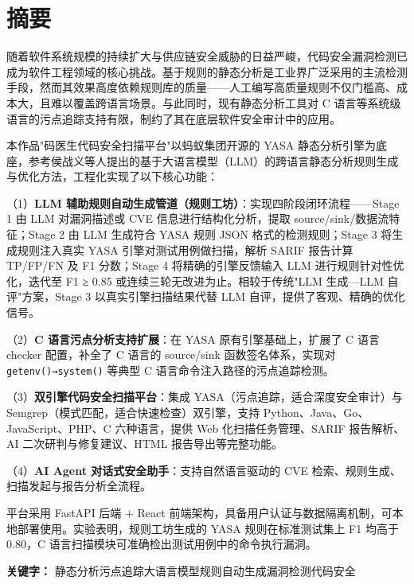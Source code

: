 \documentclass[a4paper,12pt,UTF8]{ctexart}
\numberwithin{figure}{section}
\numberwithin{table}{section}
\numberwithin{equation}{section}
\begin{document}
\thispagestyle{empty}
\tableofcontents
\newpage

\setcounter{page}{1}

\section*{摘要} 
\vspace{0.3cm}

{\songti
随着软件系统规模的持续扩大与供应链安全威胁的日益严峻，代码安全漏洞检测已成为软件工程领域的核心挑战。基于规则的静态分析是工业界广泛采用的主流检测手段，然而其效果高度依赖规则库的质量——人工编写高质量规则不仅门槛高、成本大，且难以覆盖跨语言场景。与此同时，现有静态分析工具对 C 语言等系统级语言的污点追踪支持有限，制约了其在底层软件安全审计中的应用。

本作品"码医生代码安全扫描平台"以蚂蚁集团开源的 YASA 静态分析引擎为底座，参考侯战义等人提出的基于大语言模型（LLM）的跨语言静态分析规则生成与优化方法，工程化实现了以下核心功能：

（1）\textbf{LLM 辅助规则自动生成管道（规则工坊）}：实现四阶段闭环流程——Stage 1 由 LLM 对漏洞描述或 CVE 信息进行结构化分析，提取 source/sink/数据流特征；Stage 2 由 LLM 生成符合 YASA 规则 JSON 格式的检测规则；Stage 3 将生成规则注入真实 YASA 引擎对测试用例做扫描，解析 SARIF 报告计算 TP/FP/FN 及 F1 分数；Stage 4 将精确的引擎反馈输入 LLM 进行规则针对性优化，迭代至 F1 ≥ 0.85 或连续三轮无改进为止。相较于传统"LLM 生成—LLM 自评"方案，Stage 3 以真实引擎扫描结果代替 LLM 自评，提供了客观、精确的优化信号。

（2）\textbf{C 语言污点分析支持扩展}：在 YASA 原有引擎基础上，扩展了 C 语言 checker 配置，补全了 C 语言的 source/sink 函数签名体系，实现对 \texttt{getenv()→system()} 等典型 C 语言命令注入路径的污点追踪检测。

（3）\textbf{双引擎代码安全扫描平台}：集成 YASA（污点追踪，适合深度安全审计）与 Semgrep（模式匹配，适合快速检查）双引擎，支持 Python、Java、Go、JavaScript、PHP、C 六种语言，提供 Web 化扫描任务管理、SARIF 报告解析、AI 二次研判与修复建议、HTML 报告导出等完整功能。

（4）\textbf{AI Agent 对话式安全助手}：支持自然语言驱动的 CVE 检索、规则生成、扫描发起与报告分析全流程。

平台采用 FastAPI 后端 + React 前端架构，具备用户认证与数据隔离机制，可本地部署使用。实验表明，规则工坊生成的 YASA 规则在标准测试集上 F1 均高于 0.80，C 语言扫描模块可准确检出测试用例中的命令执行漏洞。

\par}
\vspace{0.5cm}
{\noindent{}\heiti\bfseries 关键字：}{\songti
静态分析\quad 污点追踪\quad 大语言模型\quad 规则自动生成\quad 漏洞检测\quad 代码安全}
\newpage
\end{document}
